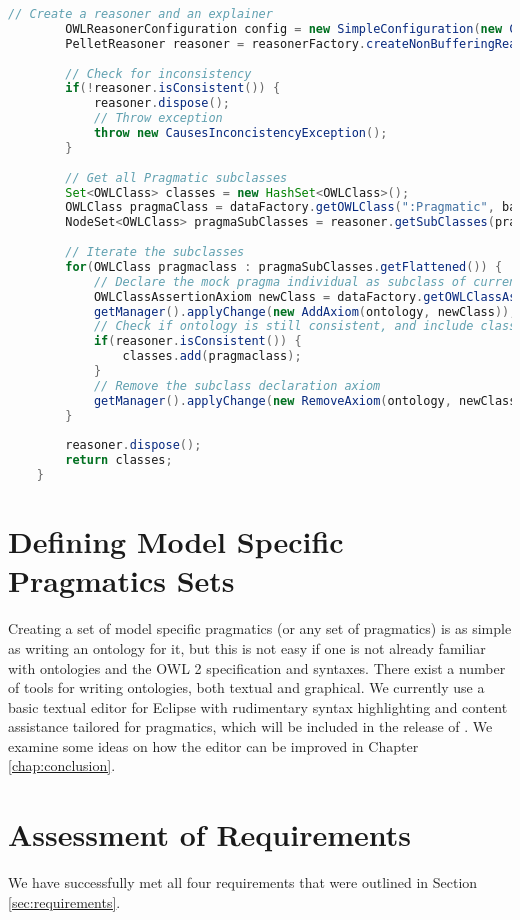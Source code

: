 	\begin{lstlisting}[language=Java,float,label=lst:validPragma4,
	caption=getValidPragmatics Part 4]
		// Create a reasoner and an explainer
		OWLReasonerConfiguration config = new SimpleConfiguration(new ConsoleProgressMonitor());
		PelletReasoner reasoner = reasonerFactory.createNonBufferingReasoner(ontology, config);
		
		// Check for inconsistency
		if(!reasoner.isConsistent()) {
			reasoner.dispose();
			// Throw exception
			throw new CausesInconcistencyException();
		}
		
		// Get all Pragmatic subclasses
		Set<OWLClass> classes = new HashSet<OWLClass>();
        OWLClass pragmaClass = dataFactory.getOWLClass(":Pragmatic", basicPrefix);
		NodeSet<OWLClass> pragmaSubClasses = reasoner.getSubClasses(pragmaClass, false);
		
		// Iterate the subclasses
		for(OWLClass pragmaclass : pragmaSubClasses.getFlattened()) {
			// Declare the mock pragma individual as subclass of current iteration item
			OWLClassAssertionAxiom newClass = dataFactory.getOWLClassAssertionAxiom(pragmaclass, pragmaInd);
			getManager().applyChange(new AddAxiom(ontology, newClass));
			// Check if ontology is still consistent, and include class if it is
			if(reasoner.isConsistent()) {
				classes.add(pragmaclass);
			}
			// Remove the subclass declaration axiom
			getManager().applyChange(new RemoveAxiom(ontology, newClass));
		}
		
		reasoner.dispose();
		return classes;
	}
	\end{lstlisting}
	
	
	
\section{Defining Model Specific Pragmatics Sets}
Creating a set of model specific pragmatics (or any set of pragmatics) is as
simple as writing an ontology for it, but this is not easy if one is not
already familiar with ontologies and the OWL 2 specification and syntaxes. There
exist a number of tools for writing ontologies, both textual and graphical. We
currently use a basic textual editor for Eclipse with rudimentary syntax
highlighting and content assistance tailored for pragmatics, which will be
included in the release of \thename{}.
We examine some ideas on how the editor can be improved in Chapter
\ref{chap:conclusion}.
	
\section{Assessment of Requirements}
We have successfully met all four requirements that were outlined in Section
\ref{sec:requirements}.


